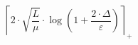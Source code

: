 \[\left\lceil 2 \cdot \sqrt{\frac{L}{\mu}} \cdot \log\left(1 + \frac{2 \cdot \Delta}{\varepsilon}\right) \right\rceil_{+}\]
